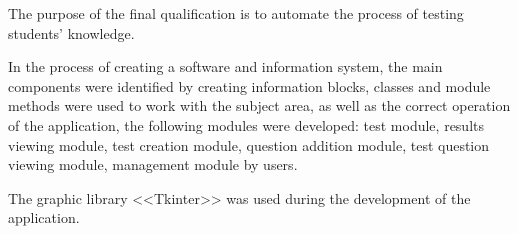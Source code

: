 The purpose of the final qualification is to automate the process of testing students' knowledge.

In the process of creating a software and information system, the main components were identified by creating information blocks, classes and module methods were used to work with the subject area, as well as the correct operation of the application, the following modules were developed: test module, results viewing module, test creation module, question addition module, test question viewing module, management module by users.

The graphic library <<Tkinter>> was used during the development of the application.
